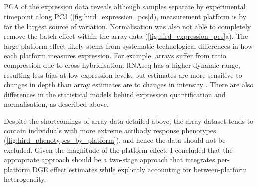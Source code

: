 \subsection{}

\gls{PCA} of the expression data reveals although samples separate by experimental timepoint along \gls{PC}3 (\autoref{fig:hird_expression_pcs}d), measurement platform is by far the largest source of variation.
Normalisation was also not able to completely remove the batch effect within the array data (\autoref{fig:hird_expression_pcs}a).
%
The large platform effect likely stems from systematic technological differences in how each platform measures expression.
For example, arrays suffer from ratio compression due to cross-hybridisation\autocite{draghici2006ReliabilityReproducibilityIssues}.
\gls{RNAseq} has a higher dynamic range, resulting less bias at low expression levels, but estimates are more sensitive to changes in depth than array estimates are to changes in intensity \autocite{robinson2015NestedParallelExperiment}.
There are also differences in the statistical models behind expression quantification and normalisation, as described above.

Despite the shortcomings of array data detailed above, the array dataset tends to contain individuals with more extreme antibody response phenotypes (\autoref{fig:hird_phenotypes_by_platform}), and hence the data should not be excluded.
Given the magnitude of the platform effect, I concluded that the appropriate approach should be a two-stage approach that integrates per-platform \gls{DGE} effect estimates while explicitly accounting for between-platform heterogeneity.

